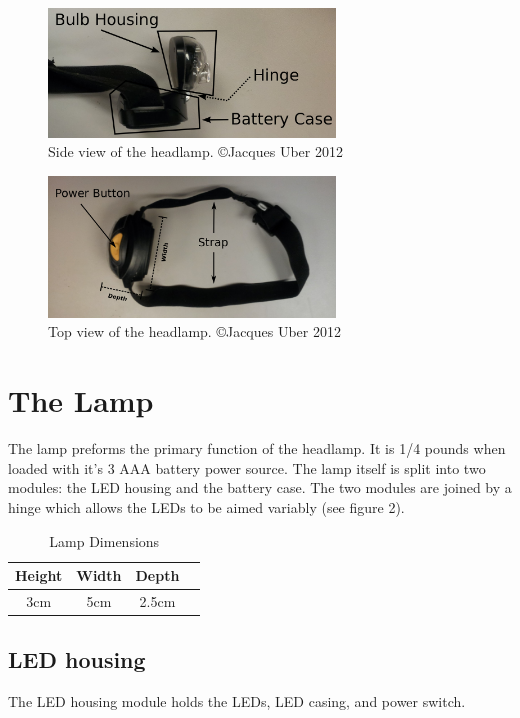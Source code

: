 \documentclass[12pt]{article}
\begin{document}
\begin{figure}[h!]
\centering
\caption[Side view of the headlamp] {Side view of the headlamp. \copyright Jacques Uber 2012}
\includegraphics[width=3in]{headlamp_side}
\end{figure}

\begin{figure}[h!]
\centering
\caption[Top view of the headlamp] {Top view of the headlamp. \copyright Jacques Uber 2012}
\includegraphics[width=3in]{headlamp_top}
\end{figure}

\section{The Lamp}
The lamp preforms the primary function of the headlamp. It is 1/4 pounds when loaded with
it's 3 AAA battery power source. The lamp itself is split into two modules: the LED housing and the
battery case. The two modules are joined by a hinge which allows the LEDs to be aimed variably (see
figure 2).

\begin{table}
\begin{center}
\begin{tabular}{ | c | c | c | p{5cm} |}
    \hline
    Height & Width & Depth \\ \hline
    3cm & 5cm & 2.5cm  \\ \hline
\end{tabular}
\end{center}
\caption{Lamp Dimensions}
\end{table}

\subsection{LED housing}
The LED housing module holds the LEDs, LED casing, and power switch.
\end{document}
